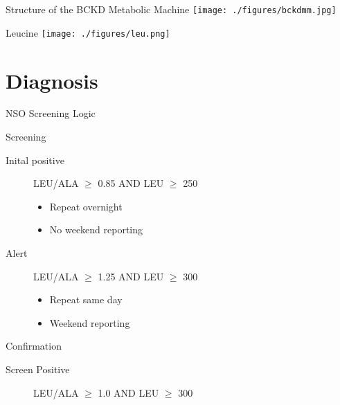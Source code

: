 \documentclass[presentation, smaller]{beamer}
\begin{document}
\begin{frame}[label={sec:orgheadline11}]{Structure of the BCKD Metabolic Machine}
\centering
\texttt{[image: ./figures/bckdmm.jpg]}
\end{frame}

\begin{frame}[label={sec:orgheadline12}]{Leucine}
\centering
\texttt{[image: ./figures/leu.png]}
\end{frame}

\section{Diagnosis}
\label{sec:orgheadline19}
\begin{frame}[label={sec:orgheadline14}]{NSO Screening Logic}
\begin{block}{Screening}
\begin{description}
\item[{Inital positive}] LEU/ALA \(\ge\) 0.85 AND LEU \(\ge\) 250
\begin{itemize}
\item Repeat overnight
\item No weekend reporting
\end{itemize}
\item[{Alert}] LEU/ALA \(\ge\) 1.25 AND LEU \(\ge\) 300
\begin{itemize}
\item Repeat same day
\item Weekend reporting
\end{itemize}
\end{description}
\end{block}

\begin{block}{Confirmation}
\begin{description}
\item[{Screen Positive}] LEU/ALA \(\ge\) 1.0 AND LEU \(\ge\) 300
\end{description}
\end{block}
\end{frame}
\end{document}
